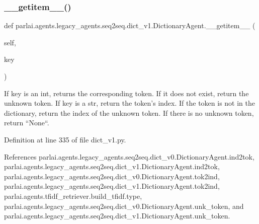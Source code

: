 \mbox{\label{classparlai_1_1agents_1_1legacy__agents_1_1seq2seq_1_1dict__v1_1_1DictionaryAgent_ab9926717ef35f03f16f1329f8ae8edc0}} 
\subsubsection{\texorpdfstring{\+\_\+\+\_\+getitem\+\_\+\+\_\+()}{\_\_getitem\_\_()}}
{\footnotesize\ttfamily def parlai.\+agents.\+legacy\+\_\+agents.\+seq2seq.\+dict\+\_\+v1.\+Dictionary\+Agent.\+\_\+\+\_\+getitem\+\_\+\+\_\+ (\begin{DoxyParamCaption}\item[{}]{self,  }\item[{}]{key }\end{DoxyParamCaption})}

\begin{DoxyVerb}If key is an int, returns the corresponding token. If it does not
exist, return the unknown token.
If key is a str, return the token's index. If the token is not in the
dictionary, return the index of the unknown token. If there is no
unknown token, return ``None``.
\end{DoxyVerb}
 

Definition at line 335 of file dict\+\_\+v1.\+py.



References parlai.\+agents.\+legacy\+\_\+agents.\+seq2seq.\+dict\+\_\+v0.\+Dictionary\+Agent.\+ind2tok, parlai.\+agents.\+legacy\+\_\+agents.\+seq2seq.\+dict\+\_\+v1.\+Dictionary\+Agent.\+ind2tok, parlai.\+agents.\+legacy\+\_\+agents.\+seq2seq.\+dict\+\_\+v0.\+Dictionary\+Agent.\+tok2ind, parlai.\+agents.\+legacy\+\_\+agents.\+seq2seq.\+dict\+\_\+v1.\+Dictionary\+Agent.\+tok2ind, parlai.\+agents.\+tfidf\+\_\+retriever.\+build\+\_\+tfidf.\+type, parlai.\+agents.\+legacy\+\_\+agents.\+seq2seq.\+dict\+\_\+v0.\+Dictionary\+Agent.\+unk\+\_\+token, and parlai.\+agents.\+legacy\+\_\+agents.\+seq2seq.\+dict\+\_\+v1.\+Dictionary\+Agent.\+unk\+\_\+token.

